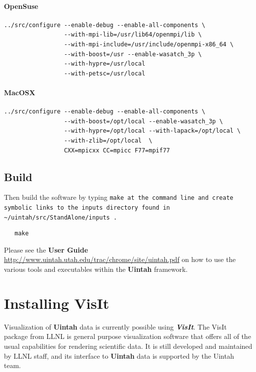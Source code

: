 \documentclass[12pt]{article}
\newcommand{\TT}[1]{\tt{#1} \normalfont}
\begin{document}
\paragraph{OpenSuse}
\begin{verbatim}
../src/configure --enable-debug --enable-all-components \
                 --with-mpi-lib=/usr/lib64/openmpi/lib \
                 --with-mpi-include=/usr/include/openmpi-x86_64 \
                 --with-boost=/usr --enable-wasatch_3p \
                 --with-hypre=/usr/local
                 --with-petsc=/usr/local
\end{verbatim}

\paragraph{MacOSX}
\begin{verbatim}
../src/configure --enable-debug --enable-all-components \
                 --with-boost=/opt/local --enable-wasatch_3p \
                 --with-hypre=/opt/local --with-lapack=/opt/local \
                 --with-zlib=/opt/local  \
                 CXX=mpicxx CC=mpicc F77=mpif77

\end{verbatim}


\subsection{Build}

Then build the software by typing \TT{make} at the command line and create symbolic links to the inputs directory found in \TT{\textasciitilde/uintah/src/StandAlone/inputs}.
\begin{verbatim}
   make
\end{verbatim}


Please see the \textbf{User Guide}
\url{http://www.uintah.utah.edu/trac/chrome/site/uintah.pdf} on how to use
the various tools and executables within the \textbf{Uintah}
framework.


\section{Installing VisIt}

Visualization of \textbf{Uintah} data is currently possible using
\textbf{\emph{VisIt}}. The VisIt package from LLNL is general purpose
visualization software that offers all of the usual capabilities for
rendering scientific data.  It is still developed and maintained by
LLNL staff, and its interface to \textbf{Uintah} data is supported by
the Uintah team.
\end{document}
